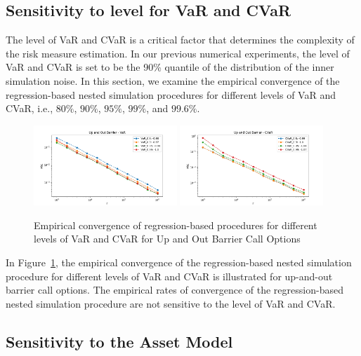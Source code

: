 \subsection{Sensitivity to level for VaR and CVaR} \label{sec1:sensitivity-level}

The level of VaR and CVaR is a critical factor that determines the complexity of the risk measure estimation.
In our previous numerical experiments, the level of VaR and CVaR is set to be the 90\% quantile of the distribution of the inner simulation noise.
In this section, we examine the empirical convergence of the regression-based nested simulation procedures for different levels of VaR and CVaR, i.e., $80\%$, $90\%$, $95\%$, $99\%$, and $99.6\%$.

\begin{figure}[ht!] 
    \centering
    \includegraphics[width=0.48\textwidth]{./project1/figures/figure9a.png}
    \includegraphics[width=0.48\textwidth]{./project1/figures/figure9b.png}
    \caption{Empirical convergence of regression-based procedures for different levels of VaR and CVaR for Up and Out Barrier Call Options}
    \label{fig1:sens_level}
\end{figure}

In Figure~\ref{fig1:sens_level}, the empirical convergence of the regression-based nested simulation procedure for different levels of VaR and CVaR is illustrated for up-and-out barrier call options.
The empirical rates of convergence of the regression-based nested simulation procedure are not sensitive to the level of VaR and CVaR.

\subsection{Sensitivity to the Asset Model} \label{sec1:sensitivity-assetModel}

